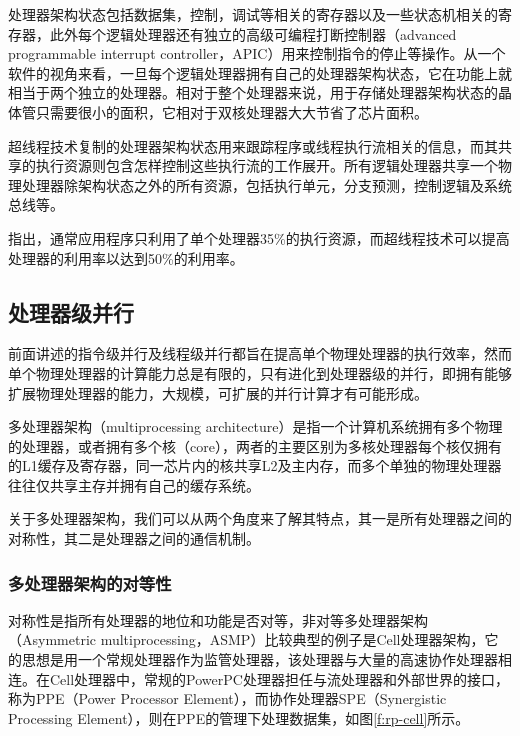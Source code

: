 处理器架构状态包括数据集，控制，调试等相关的寄存器以及一些状态机相关的寄存器，此外每个逻辑处理器还有独立的高级可编程打断控制器（advanced programmable interrupt controller，APIC）用来控制指令的停止等操作。从一个软件的视角来看，一旦每个逻辑处理器拥有自己的处理器架构状态，它在功能上就相当于两个独立的处理器。相对于整个处理器来说，用于存储处理器架构状态的晶体管只需要很小的面积，它相对于双核处理器大大节省了芯片面积。

超线程技术复制的处理器架构状态用来跟踪程序或线程执行流相关的信息，而其共享的执行资源则包含怎样控制这些执行流的工作展开。所有逻辑处理器共享一个物理处理器除架构状态之外的所有资源，包括执行单元，分支预测，控制逻辑及系统总线等。

\cite{a:IntelHyper-ThreadingTechnology}指出，通常应用程序只利用了单个处理器35\%的执行资源，而超线程技术可以提高处理器的利用率以达到50\%的利用率。




\subsection{处理器级并行}
前面讲述的指令级并行及线程级并行都旨在提高单个物理处理器的执行效率，然而单个物理处理器的计算能力总是有限的，只有进化到处理器级的并行，即拥有能够扩展物理处理器的能力，大规模，可扩展的并行计算才有可能形成。

多处理器架构（multiprocessing architecture）是指一个计算机系统拥有多个物理的处理器，或者拥有多个核（core），两者的主要区别为多核处理器每个核仅拥有的L1缓存及寄存器，同一芯片内的核共享L2及主内存，而多个单独的物理处理器往往仅共享主存并拥有自己的缓存系统。

关于多处理器架构，我们可以从两个角度来了解其特点，其一是所有处理器之间的对称性，其二是处理器之间的通信机制。



\subsubsection{多处理器架构的对等性}
对称性是指所有处理器的地位和功能是否对等，非对等多处理器架构（Asymmetric multiprocessing，ASMP）比较典型的例子是Cell处理器架构，它的思想是用一个常规处理器作为监管处理器，该处理器与大量的高速协作处理器相连。在Cell处理器中，常规的PowerPC处理器担任与流处理器和外部世界的接口，称为PPE（Power Processor Element），而协作处理器SPE（Synergistic Processing Element），则在PPE的管理下处理数据集，如图\ref{f:rp-cell}所示。

